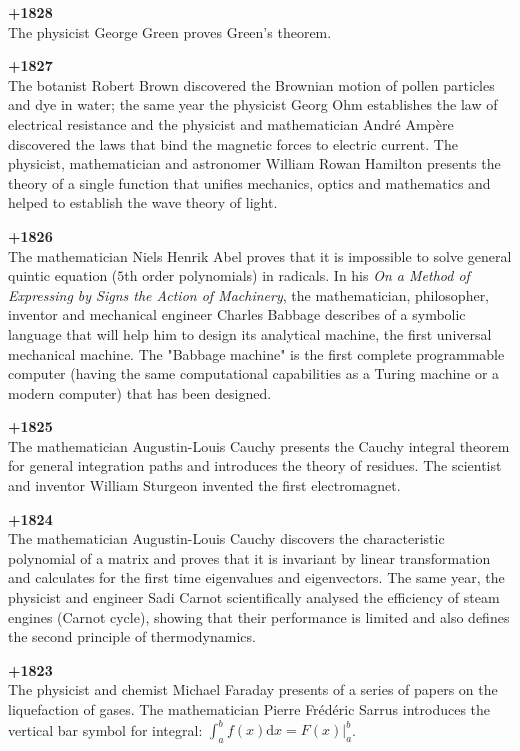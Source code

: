 \textbf{+1828}\\
The physicist George Green proves Green's theorem.

\textbf{+1827}\\
The botanist Robert Brown discovered the Brownian motion of pollen particles and dye in water; the same year the physicist Georg Ohm establishes the law of electrical resistance and the physicist and mathematician André Ampère discovered the laws that bind the magnetic forces to electric current. The physicist, mathematician and astronomer William Rowan Hamilton presents the theory of a single function that unifies mechanics, optics and mathematics and helped to establish the wave theory of light.

\textbf{+1826}\\
The mathematician Niels Henrik Abel proves that it is impossible to solve general quintic equation ($5$th order polynomials) in radicals. In his \textit{On a Method of Expressing by Signs the Action of Machinery}, the mathematician, philosopher, inventor and mechanical engineer Charles Babbage describes of a symbolic language that will help him to design its analytical machine, the first universal mechanical machine. The "Babbage machine" is the first complete programmable computer (having the same computational capabilities as a Turing machine or a modern computer) that has been designed. 

\textbf{+1825}\\
The mathematician Augustin-Louis Cauchy presents the Cauchy integral theorem for general integration paths and introduces the theory of residues. The scientist and inventor William Sturgeon invented the first electromagnet.

\textbf{+1824}\\
The mathematician Augustin-Louis Cauchy discovers the characteristic polynomial of a matrix and proves that it is invariant by linear transformation and calculates for the first time eigenvalues and eigenvectors. The same year, the physicist and engineer Sadi Carnot scientifically analysed the efficiency of steam engines (Carnot cycle), showing that their performance is limited and also defines the second principle of thermodynamics.

\textbf{+1823}\\
The physicist and chemist Michael Faraday presents of a series of papers on the liquefaction of gases.  The mathematician Pierre Frédéric Sarrus introduces the vertical bar symbol for integral: $\int_a^bf(x)\mathrm{d}x=F(x)|_a^b$.

